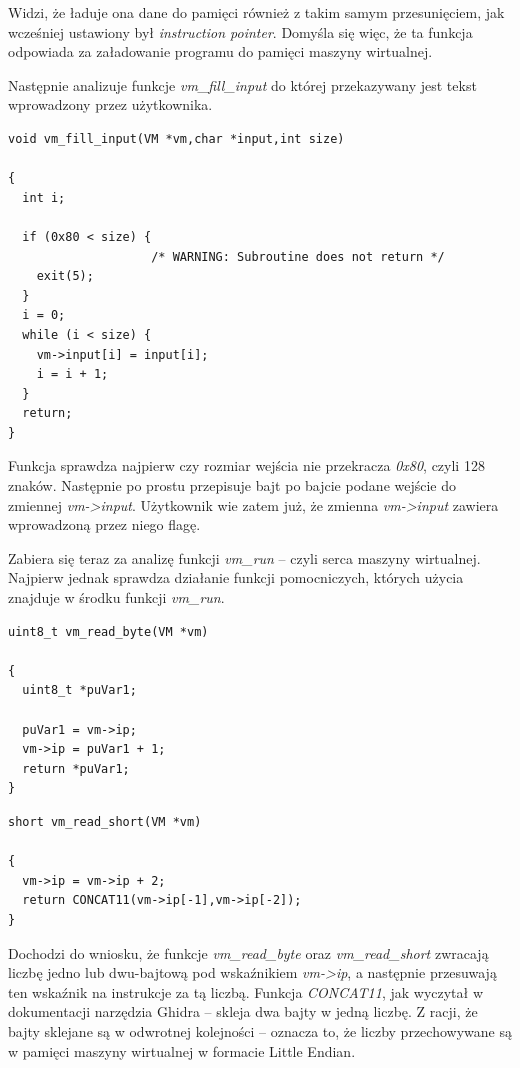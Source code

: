 \documentclass[language=polish,type=eng]{aghmodern}
\begin{document}
Widzi, że ładuje ona dane do pamięci również z takim samym przesunięciem, jak wcześniej
ustawiony był \emph{instruction pointer}. Domyśla się więc, że ta funkcja odpowiada za
załadowanie programu do pamięci maszyny wirtualnej.

Następnie analizuje funkcje \emph{vm\_fill\_input} do której przekazywany jest tekst
wprowadzony przez użytkownika.

\begin{verbatim}
void vm_fill_input(VM *vm,char *input,int size)

{
  int i;
  
  if (0x80 < size) {
                    /* WARNING: Subroutine does not return */
    exit(5);
  }
  i = 0;
  while (i < size) {
    vm->input[i] = input[i];
    i = i + 1;
  }
  return;
}
\end{verbatim}

Funkcja sprawdza najpierw czy rozmiar wejścia nie przekracza \emph{0x80}, czyli 128 znaków.
Następnie po prostu przepisuje bajt po bajcie podane wejście do zmiennej \emph{vm->input}.
Użytkownik wie zatem już, że zmienna \emph{vm->input} zawiera wprowadzoną przez niego flagę.

Zabiera się teraz za analizę funkcji \emph{vm\_run} -- czyli serca maszyny wirtualnej.
Najpierw jednak sprawdza działanie funkcji pomocniczych, których użycia znajduje w środku
funkcji \emph{vm\_run}.

\begin{verbatim}
uint8_t vm_read_byte(VM *vm)

{
  uint8_t *puVar1;
  
  puVar1 = vm->ip;
  vm->ip = puVar1 + 1;
  return *puVar1;
}
\end{verbatim}

\begin{verbatim}
short vm_read_short(VM *vm)

{
  vm->ip = vm->ip + 2;
  return CONCAT11(vm->ip[-1],vm->ip[-2]);
}
\end{verbatim}

Dochodzi do wniosku, że funkcje \emph{vm\_read\_byte} oraz \emph{vm\_read\_short}
zwracają liczbę jedno lub dwu-bajtową pod wskaźnikiem \emph{vm->ip},
a następnie przesuwają ten wskaźnik na instrukcje za tą liczbą.
Funkcja \emph{CONCAT11}, jak wyczytał w dokumentacji narzędzia Ghidra -- skleja
dwa bajty w jedną liczbę. Z racji, że bajty sklejane są w odwrotnej kolejności --
oznacza to, że liczby przechowywane są w pamięci maszyny wirtualnej w formacie Little Endian.
\end{document}
